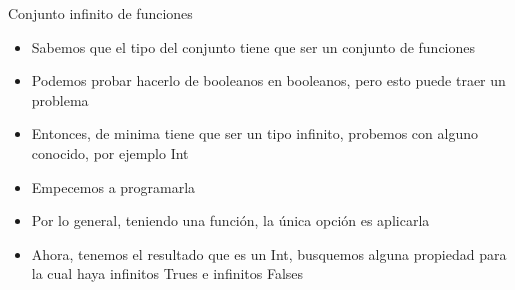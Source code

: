 \documentclass[pdf]{beamer}
\begin{document}
\begin{frame}[fragile]{Conjunto infinito de funciones}
\begin{overprint}
\end{overprint}

\begin{itemize}
    \item<1-> Sabemos que el tipo del conjunto tiene que ser un conjunto de funciones
    \item<2-> Podemos probar hacerlo de booleanos en booleanos, pero esto puede traer un problema
    \item<3-> Entonces, de minima tiene que ser un tipo infinito, probemos con alguno conocido, por ejemplo Int
    \item<5-> Empecemos a programarla
    \item<7-> Por lo general, teniendo una función, la única opción es aplicarla
    \item<9-> Ahora, tenemos el resultado que es un Int, busquemos alguna propiedad para la cual haya infinitos Trues e infinitos Falses
\end{itemize}


    
\end{frame}
\end{document}
